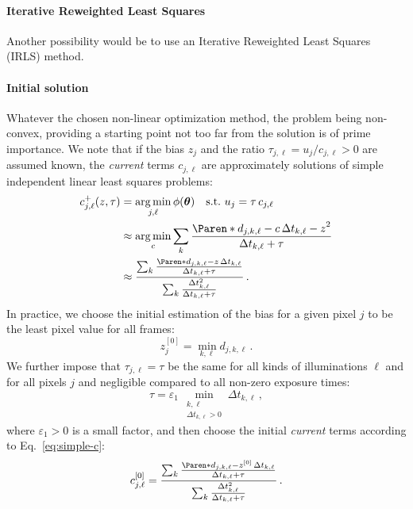 \documentclass[a4paper,11pt,twoside]{scrartcl}
\DeclareMathOperator*{\argmin}{arg\,min}
\newcommand*{\V}[1]{\boldsymbol{#1}}   %
\theoremstyle{plain} %
\theoremstyle{definition}
\theoremstyle{remark}
\newcommand*{\Iter}[1]{^{[#1]}}
\begin{document}
\paragraph{Iterative Reweighted Least Squares}
Another possibility would be to use an Iterative Reweighted Least Squares
(IRLS) method.

\paragraph{Initial solution} Whatever the chosen non-linear optimization
method, the problem being non-convex, providing a starting point not too far
from the solution is of prime importance. We note that if the bias $z_j$ and
the ratio $\tau_{j,\ell} = u_j/c_{j,\ell} > 0$ are assumed known, the
\emph{current} terms $c_{j,\ell}$ are approximately solutions of simple
independent linear least squares problems:
\begin{align}
  c^+_{j,\ell}(z,\tau)
  &= \argmin_{{j,\ell}}\phi(\V\theta)
  \quad\text{s.t.\ $u_j = \tau\,c_{j,\ell}$}\quad \notag\\
  &\approx \argmin_{c}\sum_{k} \frac{
    \Paren*{d_{j,k,\ell} - c\,\Delta t_{k,\ell} -  z}^2
  }{
    \Delta t_{k,\ell} + \tau
  } \notag\\
  &\approx \frac{
    \sum_{k} \frac{
      \Paren*{d_{j,k,\ell} - z}\,\Delta t_{k,\ell}
    }{
      \Delta t_{k,\ell} + \tau
    }
  }{
    \sum_{k} \frac{\Delta t_{k,\ell}^2}{\Delta t_{k,\ell} + \tau}
  } \,.
  \label{eq:simple-c}
\end{align}
In practice, we choose the initial estimation of the bias for a given pixel $j$
to be the least pixel value for all frames:
\begin{equation}
  z\Iter0_j = \min_{k,\ell} d_{j,k,\ell} \,.
  \label{eq:initial-bias}
\end{equation}
We further impose that $\tau_{j,\ell} = \tau$ be the same for all kinds
of illuminations $\ell$ and for all pixels $j$ and negligible compared to all
non-zero exposure times:
\begin{equation}
  \tau = \varepsilon_1\,
  \min_{\substack{
      k,\ell\\
      \Delta t_{k,\ell} > 0
  }} \Delta t_{k,\ell} \,,
  \label{eq:tau}
\end{equation}
where  $\varepsilon_1 > 0$ is a small factor, and then choose the initial
\emph{current} terms according to Eq.~\eqref{eq:simple-c}:
\begin{equation}
  c\Iter0_{j,\ell} %
  = \frac{
    \sum_{k} \frac{
      \Paren*{d_{j,k,\ell} - z\Iter0}\,\Delta t_{k,\ell}
    }{
      \Delta t_{k,\ell} + \tau
    }
  }{
    \sum_{k} \frac{\Delta t_{k,\ell}^2}{\Delta t_{k,\ell} + \tau}
  }\,.
  \label{eq:initial-c}
\end{equation}
\end{document}
